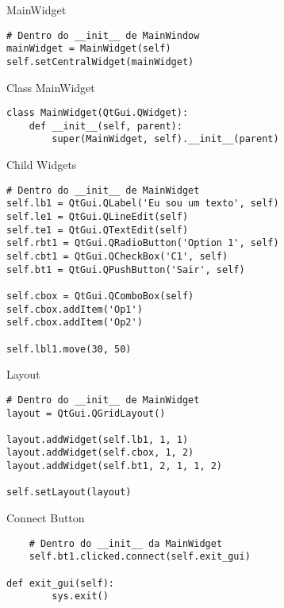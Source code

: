\documentclass[presentation]{beamer}
\begin{document}
\begin{frame}[fragile,label={sec:orgheadline8}]{MainWidget}
 \begin{verbatim}
# Dentro do __init__ de MainWindow
mainWidget = MainWidget(self)
self.setCentralWidget(mainWidget)
\end{verbatim}
\end{frame}
\begin{frame}[fragile,label={sec:orgheadline9}]{Class MainWidget}
 \begin{verbatim}
class MainWidget(QtGui.QWidget):
    def __init__(self, parent):
        super(MainWidget, self).__init__(parent)
\end{verbatim}
\end{frame}
\begin{frame}[fragile,label={sec:orgheadline10}]{Child Widgets}
 \begin{verbatim}
# Dentro do __init__ de MainWidget
self.lb1 = QtGui.QLabel('Eu sou um texto', self)
self.le1 = QtGui.QLineEdit(self)
self.te1 = QtGui.QTextEdit(self)
self.rbt1 = QtGui.QRadioButton('Option 1', self)
self.cbt1 = QtGui.QCheckBox('C1', self)
self.bt1 = QtGui.QPushButton('Sair', self)

self.cbox = QtGui.QComboBox(self)
self.cbox.addItem('Op1')
self.cbox.addItem('Op2')

self.lbl1.move(30, 50)
\end{verbatim}
\end{frame}
\begin{frame}[fragile,label={sec:orgheadline11}]{Layout}
 \begin{verbatim}
# Dentro do __init__ de MainWidget
layout = QtGui.QGridLayout()

layout.addWidget(self.lb1, 1, 1)
layout.addWidget(self.cbox, 1, 2)
layout.addWidget(self.bt1, 2, 1, 1, 2)

self.setLayout(layout)
\end{verbatim}
\end{frame}
\begin{frame}[fragile,label={sec:orgheadline12}]{Connect Button}
 \begin{verbatim}
    # Dentro do __init__ da MainWidget
    self.bt1.clicked.connect(self.exit_gui)

def exit_gui(self):
        sys.exit()
\end{verbatim}
\end{frame}
\end{document}

